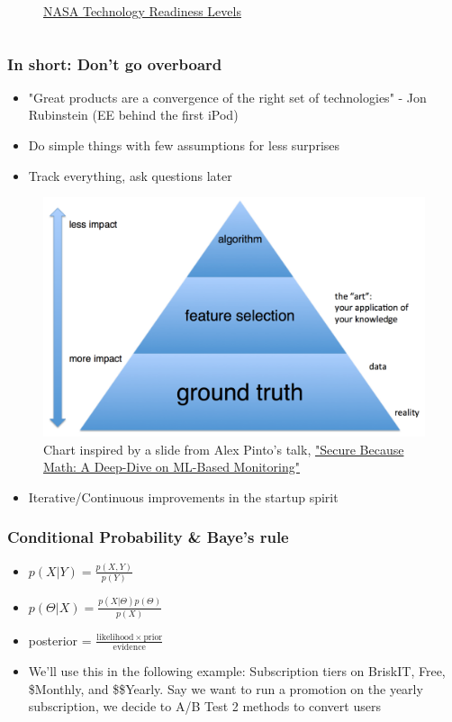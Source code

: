 \documentclass{beamer}
\begin{document}
\begin{frame}
\begin{columns}
\begin{figure}
			\caption{\href{https://en.wikipedia.org/wiki/Technology_readiness_level}{NASA Technology Readiness Levels}}
		\end{figure}
	\end{columns} 
\end{frame}


\begin{frame}
	\frametitle{In short: Don't go overboard}
	\begin{itemize}
		\item "Great products are a convergence of the right set of technologies" - Jon Rubinstein (EE behind the first iPod)
		\item Do simple things with few assumptions for less surprises
		\item Track everything, ask questions later
	\end{itemize}
	\begin{figure}
		\centering
		\includegraphics[width=0.4\linewidth]{alex_pinto}
		\caption{Chart inspired by a slide from Alex Pinto's talk,  \href{https://www.youtube.com/watch?v=TYVCVzEJhhQ}{"Secure Because Math: A Deep-Dive on ML-Based Monitoring"}}
	\end{figure}
	\begin{itemize}
		\item Iterative/Continuous improvements in the startup spirit
	\end{itemize}
\end{frame}


\begin{frame}
	\frametitle{Conditional Probability \& Baye's rule}
	\begin{itemize}
		\item $p(X|Y) = \frac{p(X,Y)}{p(Y)}$
		\item $p(\Theta|X) = \frac{p(X|\Theta)p(\Theta)}{p(X)}$
		\item posterior = $\frac{\mathrm{likelihood} \times \mathrm{prior} }{\mathrm{evidence}}$
		\item We'll use this in the following example: Subscription tiers on BriskIT, Free, \$Monthly, and \$\$Yearly. Say we want to run a promotion on the yearly subscription, we decide to A/B Test 2 methods to convert users
	\end{itemize}
\end{frame}
\end{document}
